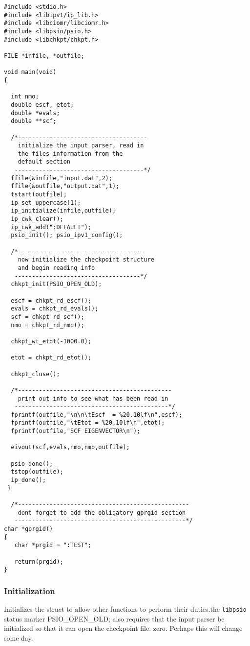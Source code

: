 \begin{verbatim}
#include <stdio.h>
#include <libipv1/ip_lib.h>
#include <libciomr/libciomr.h>
#include <libpsio/psio.h>
#include <libchkpt/chkpt.h>

FILE *infile, *outfile;

void main(void)
{
 
  int nmo;
  double escf, etot;
  double *evals;
  double **scf;

  /*-------------------------------------
    initialize the input parser, read in
    the files information from the
    default section
   -------------------------------------*/
  ffile(&infile,"input.dat",2);
  ffile(&outfile,"output.dat",1);
  tstart(outfile);
  ip_set_uppercase(1);
  ip_initialize(infile,outfile);
  ip_cwk_clear();
  ip_cwk_add(":DEFAULT");
  psio_init(); psio_ipv1_config();

  /*------------------------------------
    now initialize the checkpoint structure
    and begin reading info
   ------------------------------------*/
  chkpt_init(PSIO_OPEN_OLD);

  escf = chkpt_rd_escf();
  evals = chkpt_rd_evals();
  scf = chkpt_rd_scf();
  nmo = chkpt_rd_nmo();
 
  chkpt_wt_etot(-1000.0);
  
  etot = chkpt_rd_etot();

  chkpt_close();

  /*--------------------------------------------
    print out info to see what has been read in
   --------------------------------------------*/
  fprintf(outfile,"\n\n\tEscf  = %20.10lf\n",escf);
  fprintf(outfile,"\tEtot = %20.10lf\n",etot);
  fprintf(outfile,"SCF EIGENVECTOR\n");

  eivout(scf,evals,nmo,nmo,outfile); 
  
  psio_done();
  tstop(outfile);
  ip_done();
 }

  /*-------------------------------------------------
    dont forget to add the obligatory gprgid section 
   -------------------------------------------------*/
char *gprgid()
{
   char *prgid = ":TEST";

   return(prgid);
}
\end{verbatim}

\subsubsection{Initialization}
{Initializes the  struct to allow other 
functions to perform their duties.}{the {\tt libpsio} status marker PSIO\_OPEN\_OLD; also requires that
the input parser be initialized so that it can open the checkpoint file.}
{zero.  Perhaps this will change some day.} \\

